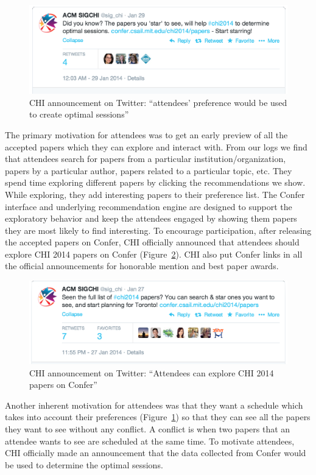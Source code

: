 \documentclass{sigchi}
\begin{document}
\begin{figure}[!h]
\centering
\includegraphics[width=0.95\columnwidth]{chi-announcement-1.png}
\caption{CHI announcement on Twitter: ``attendees' preference would be used to create optimal sessions''}
\label{chi-announcement-1}
\end{figure}

The primary motivation for attendees was to get an early preview of all the accepted papers which they can explore and interact with. From our logs we find that attendees search for papers from a particular institution/organization, papers by a particular author, papers related to a particular topic, etc. They spend time exploring different papers by clicking the recommendations we show. While exploring, they add interesting papers to their preference list. The Confer interface and underlying recommendation engine are designed to support the exploratory behavior and keep the attendees engaged by showing them papers they are most likely to find interesting. To encourage participation, after releasing the accepted papers on Confer, CHI officially announced that attendees should explore CHI 2014 papers on Confer (Figure~\ref{chi-announcement-2}). CHI also put Confer links in all the official announcements for honorable mention and best paper awards. 

\begin{figure}[!h]
\centering
\includegraphics[width=0.95\columnwidth]{chi-announcement-2.png}
\caption{CHI announcement on Twitter: ``Attendees can explore CHI 2014 papers on Confer''}
\label{chi-announcement-2}
\end{figure}

Another inherent motivation for attendees was that they want a schedule which takes into account their preferences (Figure~\ref{chi-announcement-1}) so that they can see all the papers they want to see without any conflict. A conflict is when two papers that an attendee wants to see are scheduled at the same time. To motivate attendees, CHI officially made an announcement that the data collected from Confer would be used to determine the optimal sessions.
\end{document}
